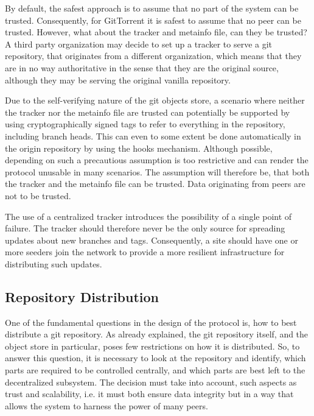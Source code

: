 By default, the safest approach is to assume that no part of the
system can be trusted. Consequently, for GitTorrent it is safest to
assume that no peer can be trusted. However, what about the tracker
and metainfo file, can they be trusted? A third party organization may
decide to set up a tracker to serve a git repository, that originates
from a different organization, which means that they are in no way
authoritative in the sense that they are the original source, although
they may be serving the original vanilla repository.

Due to the self-verifying nature of the git objects store, a scenario
where neither the tracker nor the metainfo file are trusted can
potentially be supported by using cryptographically signed tags to
refer to everything in the repository, including branch heads. This
can even to some extent be done automatically in the origin repository
by using the hooks mechanism. Although possible, depending on such a
precautious assumption is too restrictive and can render the protocol
unusable in many scenarios. The assumption
will therefore be, that both the tracker and the metainfo file can be
trusted. Data originating from peers are not to be trusted.

The use of a centralized tracker introduces the possibility of a single
point of failure. The tracker should therefore never be the only
source for spreading updates about new branches and tags.
Consequently, a site should have one or more seeders join the network
to provide a more resilient infrastructure for distributing such
updates.




\subsection{Repository Distribution}

One of the fundamental questions in the design of the protocol is, how
to best distribute a git repository. As already explained, the git
repository itself, and the object store in particular, poses few
restrictions on how it is distributed. So, to answer this question, it
is necessary to look at the repository and
identify, which parts are required to be controlled centrally, and
which parts are best left to the decentralized subsystem. The decision
must take into account, such aspects as trust and scalability, i.e. it
must both ensure data integrity but in a way that allows the system to
harness the power of many peers.

